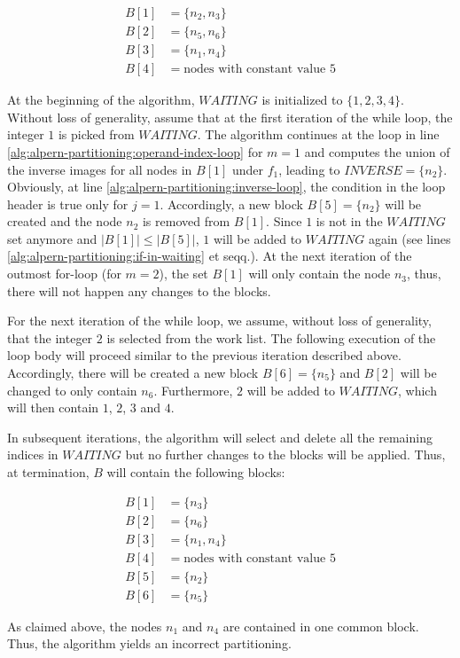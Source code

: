 \vspace{-10pt}
\begin{align*}
B[1] &= \lbrace n_2,n_3\rbrace\\
B[2] &= \lbrace n_5,n_6\rbrace\\
B[3] &= \lbrace n_1,n_4\rbrace\\
B[4] &= \text{nodes with constant value } 5
\end{align*}

At the beginning of the algorithm, $\textit{WAITING}$ is initialized to $\lbrace 1, 2, 3, 4\rbrace$. Without loss of generality, assume that at the first iteration of the while loop, the integer $1$ is picked from $\textit{WAITING}$. The algorithm continues at the loop in line \ref{alg:alpern-partitioning:operand-index-loop} for $m = 1$ and computes the union of the inverse images for all nodes in $B[1]$ under $f_1$, leading to $\textit{INVERSE} = \lbrace n_2\rbrace$. Obviously, at line \ref{alg:alpern-partitioning:inverse-loop}, the condition in the loop header is true only for $j = 1$. Accordingly, a new block $B[5] = \lbrace n_2\rbrace$ will be created and the node $n_2$ is removed from $B[1]$. Since $1$ is not in the $\textit{WAITING}$ set anymore and $|B[1]| \leq |B[5]|$, $1$ will be added to $\textit{WAITING}$ again (see lines \ref{alg:alpern-partitioning:if-in-waiting} et seqq.). At the next iteration of the outmost for-loop (for $m = 2$), the set $B[1]$ will only contain the node $n_3$, thus, there will not happen any changes to the blocks.

For the next iteration of the while loop, we assume, without loss of generality, that the integer $2$ is selected from the work list. The following execution of the loop body will proceed similar to the previous iteration described above. Accordingly, there will be created a new block $B[6] = \lbrace n_5\rbrace$ and $B[2]$ will be changed to only contain $n_6$. Furthermore, $2$ will be added to $\textit{WAITING}$, which will then contain $1$, $2$, $3$ and $4$.

In subsequent iterations, the algorithm will select and delete all the remaining indices in $\textit{WAITING}$ but no further changes to the blocks will be applied. Thus, at termination, $B$ will contain the following blocks:

\vspace{-10pt}
\begin{align*}
B[1] &= \lbrace n_3\rbrace \\
B[2] &= \lbrace n_6\rbrace \\
B[3] &= \lbrace n_1,n_4\rbrace \\
B[4] &= \text{nodes with constant value } 5 \\
B[5] &= \lbrace n_2\rbrace \\
B[6] &= \lbrace n_5\rbrace
\end{align*}

As claimed above, the nodes $n_1$ and $n_4$ are contained in one common block. Thus, the algorithm yields an incorrect partitioning.